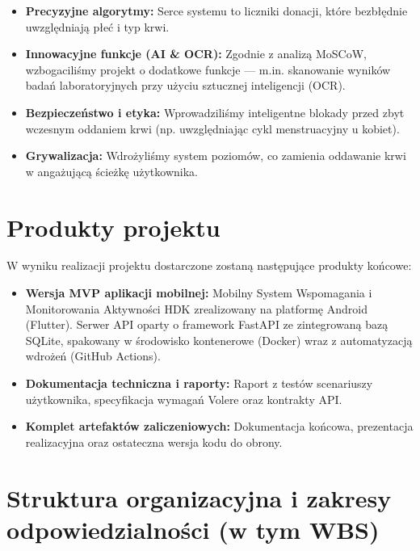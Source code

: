 \documentclass[11pt, a4paper]{article}
\begin{document}
\begin{itemize}
  \item \textbf{Precyzyjne algorytmy:} Serce systemu to liczniki donacji, które
        bezbłędnie uwzględniają płeć i typ krwi.

  \item \textbf{Innowacyjne funkcje (AI \& OCR):} Zgodnie z analizą MoSCoW,
        wzbogaciliśmy projekt o dodatkowe funkcje — m.in. skanowanie wyników badań
        laboratoryjnych przy użyciu sztucznej inteligencji (OCR).

  \item \textbf{Bezpieczeństwo i etyka:} Wprowadziliśmy inteligentne blokady przed
        zbyt wczesnym oddaniem krwi (np. uwzględniając cykl menstruacyjny u kobiet).

  \item \textbf{Grywalizacja:} Wdrożyliśmy system poziomów, co zamienia oddawanie krwi
        w angażującą ścieżkę użytkownika.
\end{itemize}

\section{Produkty projektu}

W wyniku realizacji projektu dostarczone zostaną następujące produkty końcowe:

\begin{itemize}
  \item \textbf{Wersja MVP aplikacji mobilnej:} Mobilny System Wspomagania i Monitorowania Aktywności HDK zrealizowany na platformę Android (Flutter). Serwer API oparty o framework FastAPI ze zintegrowaną bazą SQLite, spakowany w środowisko kontenerowe (Docker) wraz z automatyzacją wdrożeń (GitHub Actions).
  \item \textbf{Dokumentacja techniczna i raporty:} Raport z testów scenariuszy użytkownika, specyfikacja wymagań Volere oraz kontrakty API.
  \item \textbf{Komplet artefaktów zaliczeniowych:} Dokumentacja końcowa, prezentacja realizacyjna oraz ostateczna wersja kodu do obrony.
\end{itemize}

\section{Struktura organizacyjna i zakresy odpowiedzialności (w tym WBS)}
\end{document}

